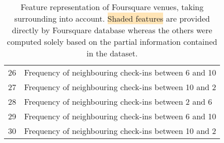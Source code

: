 \begin{table}[hb]
\begin{tabularx}{\textwidth}{lX}
	26 & Frequency of neighbouring check-ins between 6 \am{} and 10 \am{} \\
	27 & Frequency of neighbouring check-ins between 10 \am{} and 2 \hpm{} \\
	28 & Frequency of neighbouring check-ins between 2 \hpm{} and 6 \hpm{} \\
	29 & Frequency of neighbouring check-ins between 6 \hpm{} and 10 \hpm{} \\
	30 & Frequency of neighbouring check-ins between 10 \hpm{} and 2 \am{} \\
        \bottomrule
    \end{tabularx}
    \caption[Venue features]{Feature representation of Foursquare venues,
	    taking surrounding into account. \colorbox{Moccasin}{Shaded
	    features} are provided directly by Foursquare database whereas the
	    others were computed solely based on the partial information
	    contained in the dataset.\label{tab:venuefeatures}}
\end{table}

\clearpage


